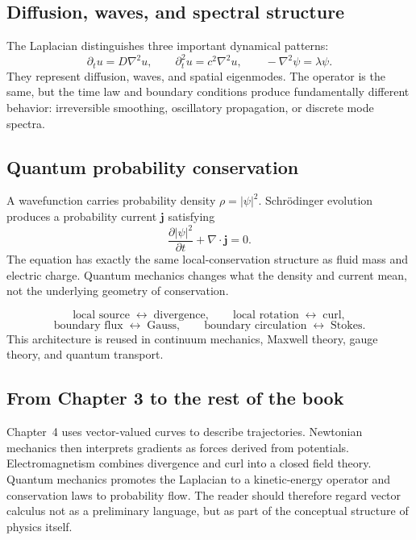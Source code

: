 \subsection{Diffusion, waves, and spectral structure}
The Laplacian distinguishes three important dynamical patterns:
\[
\partial_tu=D\nabla^2u,
\qquad
\partial_t^2u=c^2\nabla^2u,
\qquad
-\nabla^2\psi=\lambda\psi.
\]
They represent diffusion, waves, and spatial eigenmodes. The operator is the same, but the time law and boundary conditions produce fundamentally different behavior: irreversible smoothing, oscillatory propagation, or discrete mode spectra.

\subsection{Quantum probability conservation}
A wavefunction carries probability density $\rho=|\psi|^2$. Schrödinger evolution produces a probability current $\mathbf j$ satisfying
\[
\frac{\partial |\psi|^2}{\partial t}+\nabla\cdot\mathbf j=0.
\]
The equation has exactly the same local-conservation structure as fluid mass and electric charge. Quantum mechanics changes what the density and current mean, not the underlying geometry of conservation.

\begin{roadmapbox}
\[
\text{local source}\;\longleftrightarrow\;\text{divergence},\qquad
\text{local rotation}\;\longleftrightarrow\;\text{curl},
\]
\[
\text{boundary flux}\;\longleftrightarrow\;\text{Gauss},\qquad
\text{boundary circulation}\;\longleftrightarrow\;\text{Stokes}.
\]
This architecture is reused in continuum mechanics, Maxwell theory, gauge theory, and quantum transport.
\end{roadmapbox}

\subsection{From Chapter 3 to the rest of the book}
Chapter~4 uses vector-valued curves to describe trajectories. Newtonian mechanics then interprets gradients as forces derived from potentials. Electromagnetism combines divergence and curl into a closed field theory. Quantum mechanics promotes the Laplacian to a kinetic-energy operator and conservation laws to probability flow. The reader should therefore regard vector calculus not as a preliminary language, but as part of the conceptual structure of physics itself.
